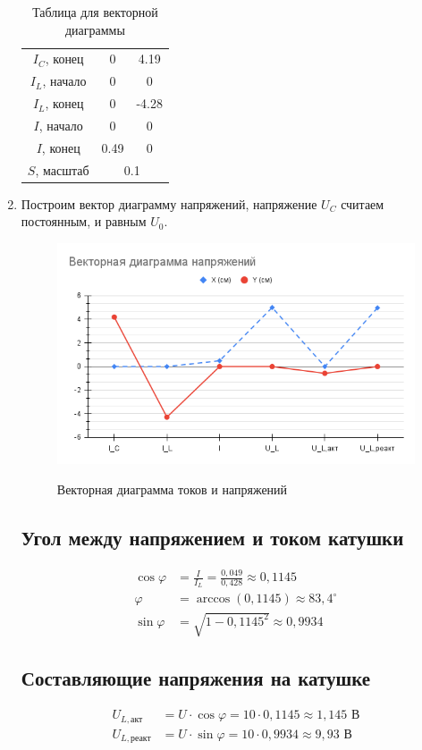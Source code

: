 \documentclass[a4paper, 12pt]{article}
\begin{document}
\begin{enumerate}
\begin{table}[htbp]
\begin{tabular}{|c|c|c|}
            $I_{C}$, конец & 0 & 4.19\\
            $I_{L}$, начало & 0 & 0\\
            $I_{L}$, конец & 0 & -4.28\\
            $I$, начало & 0 & 0\\
            $I$, конец & 0.49 & 0\\
            \hline
            $S$, масштаб & \multicolumn{2}{|c|}{0.1}\\
            \hline
        \end{tabular}
        \caption{Таблица для векторной диаграммы}
        \label{Таблица для векторной диаграммы}
    \end{table}
    \item Построим вектор диаграмму напряжений, напряжение $U_{C}$ считаем постоянным, и равным $U_{0}$.
    \begin{figure}[H]
        \centering
        \includegraphics[width=0.7\linewidth]{volt_diag.png}
        \label{Векторная диаграмма токов и напряжений}
        \caption{Векторная диаграмма токов и напряжений}
    \end{figure}
    \subsection*{Угол между напряжением и током катушки}
    \begin{align*}
        \cos \varphi &= \frac{I}{I_L} = \frac{0,049}{0,428} \approx 0,1145 \\
        \varphi &= \arccos(0,1145) \approx 83,4^\circ \\
        \sin \varphi &= \sqrt{1 - 0,1145^2} \approx 0,9934
    \end{align*}
    \subsection*{Составляющие напряжения на катушке}
    \begin{align*}
        U_{L,\text{акт}} &= U \cdot \cos \varphi = 10 \cdot 0,1145 \approx 1,145\text{ В} \\
        U_{L,\text{реакт}} &= U \cdot \sin \varphi = 10 \cdot 0,9934 \approx 9,93\text{ В}
    \end{align*}

\end{enumerate}
\end{document}
